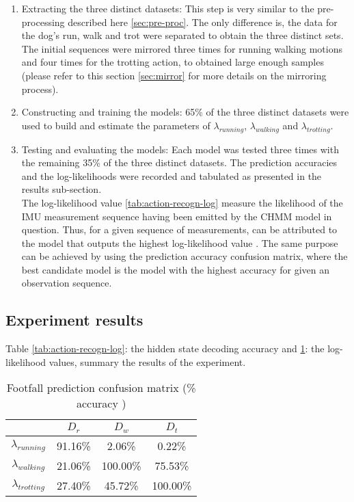 \begin{enumerate}
	\item Extracting the three distinct datasets: This step is very similar to the pre-processing described here \ref{sec:pre-proc}. The only difference is, the data for the dog's run, walk and trot were separated to obtain the three distinct sets. The initial sequences were mirrored three times for running walking motions and four times for the trotting action, to obtained large enough samples (please refer to this section \ref{sec:mirror} for more details on the mirroring process).
	
	\item Constructing and training the models: 65\% of the three distinct datasets were used to build and estimate the parameters of \(\lambda_{running}\), \(\lambda_{walking}\) and \(\lambda_{trotting}\).
	
	\item Testing and evaluating the models: Each model was tested three times with the remaining 35\% of the three distinct datasets. The prediction accuracies and the log-likelihoods were recorded and tabulated as presented in the results sub-section.\\
	The log-likelihood value \ref{tab:action-recogn-log} measure the likelihood of the IMU measurement sequence having been emitted by the CHMM model in question.
	Thus, for a given sequence of measurements, can be attributed to the model that outputs the highest log-likelihood value \cite{cont2013}.
	The same purpose can be achieved by using the prediction accuracy confusion matrix, where the best candidate model is the model  with the highest accuracy for given an observation sequence.
\end{enumerate} 

\subsection{Experiment results}

Table \ref{tab:action-recogn-log}: the hidden state decoding accuracy and \ref{tab:action-recogn-acc}: the log-likelihood values, summary the results of the experiment.\\

\begin{table}[h!] 
	\centering
	\begin{tabular}{ |c|c|c|c|} 	
		\hline	
		& \(D_r\) &  \(D_w\) & \(D_t\)\\ 
		\hline
		\(\lambda_{running}\) & 91.16\% & 2.06\% & 0.22\% \\ 
		\hline
		\(\lambda_{walking}\) & 21.06\% & 100.00\% & 75.53\% \\ 
		\hline
		\(\lambda_{trotting}\) & 27.40\% & 45.72\% & 100.00\%\\
		\hline	   	
	\end{tabular}
	\caption{Footfall prediction confusion matrix (\% accuracy )}
	\label{tab:action-recogn-acc}
\end{table}


